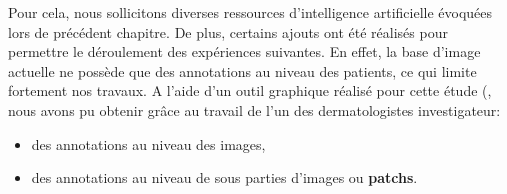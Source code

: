 Pour cela, nous sollicitons diverses ressources d'intelligence artificielle évoquées lors de précédent chapitre. De plus, certains ajouts ont été réalisés pour permettre le déroulement des expériences suivantes. En effet, la base d'image actuelle ne possède que des annotations au niveau des patients, ce qui limite fortement nos travaux.
A l'aide d'un outil graphique réalisé pour cette étude (, nous avons pu obtenir grâce au travail de l'un des dermatologistes investigateur:
\begin{itemize}
\item des annotations au niveau des images,
\item des annotations au niveau de sous parties d'images ou \textbf{patchs}.
\end{itemize}\par

